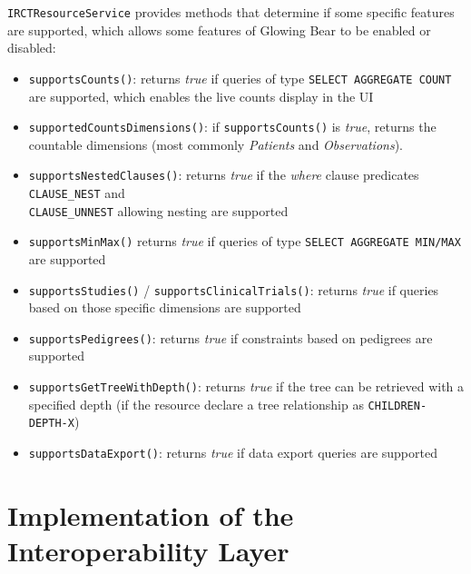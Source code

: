 \verb|IRCTResourceService| provides methods that determine if some specific features are supported, which allows some features of Glowing Bear to be enabled or disabled:
\begin{itemize}
    \item \verb|supportsCounts()|: returns \emph{true} if queries of type \verb|SELECT AGGREGATE COUNT| are supported, which enables the live counts display in the UI
    \item \verb|supportedCountsDimensions()|: if \verb|supportsCounts()| is \emph{true}, returns the countable dimensions (most commonly \emph{Patients} and \emph{Observations}).
    \item \verb|supportsNestedClauses()|: returns \emph{true} if the \emph{where} clause predicates \verb|CLAUSE_NEST| and \\
    \verb|CLAUSE_UNNEST| allowing nesting are supported
    \item \verb|supportsMinMax()| returns \emph{true} if queries of type \verb|SELECT AGGREGATE MIN/MAX| are supported
    \item \verb|supportsStudies()| / \verb|supportsClinicalTrials()|: returns \emph{true} if queries based on those specific dimensions are supported 
    \item \verb|supportsPedigrees()|: returns \emph{true} if constraints based on pedigrees are supported
    \item \verb|supportsGetTreeWithDepth()|: returns \emph{true} if the tree can be retrieved with a specified depth (if the resource declare a tree relationship as \verb|CHILDREN-DEPTH-X|)
    \item \verb|supportsDataExport()|: returns \emph{true} if data export queries are supported
\end{itemize}


\newpage
\section{Implementation of the Interoperability Layer}

